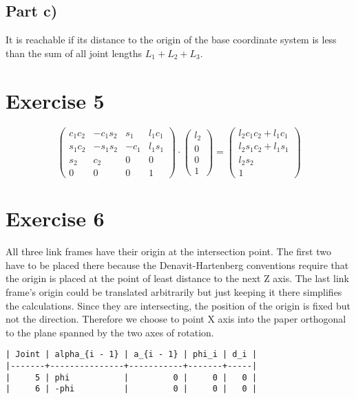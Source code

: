 \documentclass[10pt,a4paper]{article}
\begin{document}
\subsection*{Part c)}

It is reachable if its distance to the origin of the base coordinate system is less than the sum of all joint lengths $L_{1} + L_{2} + L_{3}$.

\section*{Exercise 5}

\begin{equation*}
  \begin{pmatrix}
    c_{1}c_{2} & -c_{1}s_{2} & s_{1} & l_{1}c_{1}\\
    s_{1}c_{2} & -s_{1}s_{2} & -c_{1} & l_{1}s_{1}\\
    s_{2} & c_{2} & 0 & 0\\
    0 & 0 & 0 & 1
  \end{pmatrix}
  \cdot
  \begin{pmatrix}
    l_{2}\\0\\0\\1
  \end{pmatrix}
  =
  \begin{pmatrix}
    l_{2}c_{1}c_{2} + l_{1}c_{1}\\
    l_{2}s_{1}c_{2} + l_{1}s_{1}\\
    l_{2}s_{2}\\
    1
  \end{pmatrix}
\end{equation*}

\section*{Exercise 6}

All three link frames have their origin at the intersection point.
The first two have to be placed there because the Denavit-Hartenberg conventions require that the origin is placed at the point of least distance to the next Z axis.
The last link frame's origin could be translated arbitrarily but just keeping it there simplifies the calculations.
Since they are intersecting, the position of the origin is fixed but not the direction.
Therefore we choose to point X axis into the paper orthogonal to the plane spanned by the two axes of rotation.

\begin{verbatim}
| Joint | alpha_{i - 1} | a_{i - 1} | phi_i | d_i |
|-------+---------------+-----------+-------+-----|
|     5 | phi           |         0 |     0 |   0 |
|     6 | -phi          |         0 |     0 |   0 |

\end{verbatim}
\end{document}
